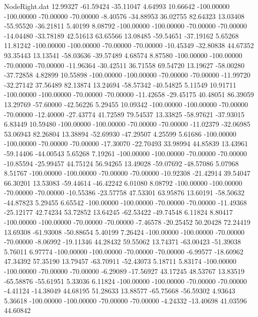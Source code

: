 \begin{filecontents}{NodeRight.dat}
  12.99327  -61.59424  -35.11047     4.64993   10.66642 -100.00000 -100.00000  -70.00000  -70.00000   -8.40576  -34.88953   36.02755   82.64323
  13.03408  -55.95520  -36.21811     5.40199    8.08792 -100.00000 -100.00000  -70.00000  -70.00000  -14.04480  -33.78189   42.51613   63.65566
  13.08485  -59.54651  -37.19162     5.65268   11.81242 -100.00000 -100.00000  -70.00000  -70.00000  -10.45349  -32.80838   44.67352   93.35443
  13.13541  -58.03636  -39.57489     4.68574    8.87580 -100.00000 -100.00000  -70.00000  -70.00000  -11.96364  -30.42511   36.71558   69.54720
  13.19627  -58.00280  -37.72858     4.82899   10.55898 -100.00000 -100.00000  -70.00000  -70.00000  -11.99720  -32.27142   37.56489   82.13874
  13.24694  -58.57342  -40.54825     5.11549   10.91711 -100.00000 -100.00000  -70.00000  -70.00000  -11.42658  -29.45175   40.48051   86.39059
  13.29769  -57.60000  -42.56226     5.29455   10.09342 -100.00000 -100.00000  -70.00000  -70.00000  -12.40000  -27.43774   41.72589   79.54537
  13.33825  -58.97621  -37.93015     6.83449   10.59480 -100.00000 -100.00000  -70.00000  -70.00000  -11.02379  -32.06985   53.06943   82.26804
  13.38894  -52.69930  -47.29507     4.25599    5.61686 -100.00000 -100.00000  -70.00000  -70.00000  -17.30070  -22.70493   33.98994   44.85839
  13.43961  -59.14406  -44.00543     5.65268    7.19261 -100.00000 -100.00000  -70.00000  -70.00000  -10.85594  -25.99457   44.75124   56.94265
  13.49028  -59.07692  -48.57086     5.07968    8.51767 -100.00000 -100.00000  -70.00000  -70.00000  -10.92308  -21.42914   39.54047   66.30201
  13.53083  -59.44614  -46.42242     6.01080    8.08792 -100.00000 -100.00000  -70.00000  -70.00000  -10.55386  -23.57758   47.53301   63.95876
  13.60191  -58.50632  -44.87823     5.29455    6.65542 -100.00000 -100.00000  -70.00000  -70.00000  -11.49368  -25.12177   42.74234   53.72852
  13.64245  -62.53422  -49.74548     6.11824    8.80417 -100.00000 -100.00000  -70.00000  -70.00000   -7.46578  -20.25452   50.20428   72.24419
  13.69308  -61.93008  -50.88654     5.40199    7.26424 -100.00000 -100.00000  -70.00000  -70.00000   -8.06992  -19.11346   44.28432   59.55062
  13.74371  -63.00423  -51.39038     5.76011    6.97774 -100.00000 -100.00000  -70.00000  -70.00000   -6.99577  -18.60962   47.34392   57.35190
  13.79457  -63.70911  -52.43073     5.18711    5.83174 -100.00000 -100.00000  -70.00000  -70.00000   -6.29089  -17.56927   43.17245   48.53767
  13.83519  -65.58876  -55.61951     5.33036    6.11824 -100.00000 -100.00000  -70.00000  -70.00000   -4.41124  -14.38049   44.68195   51.28633
  13.88577  -65.75668  -56.59302     4.93643    5.36618 -100.00000 -100.00000  -70.00000  -70.00000   -4.24332  -13.40698   41.03596   44.60842

\end{filecontents}
